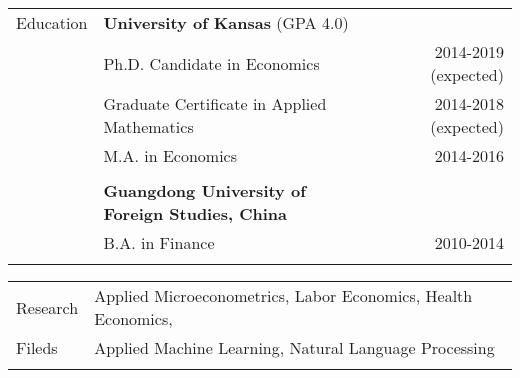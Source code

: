 \documentclass[letterpaper, 11pt]{article}
\begin{document}
\vspace{8mm}


\noindent \begin{tabular}{@{} p{3cm} p{10cm} r}
	\Large{Education}    & \textbf{University of Kansas} (GPA 4.0)\\
	& \hspace{5mm}Ph.D. Candidate in Economics & 2014-2019 (expected) \\
	& \hspace{5mm}Graduate Certificate in Applied Mathematics & 2014-2018 (expected) \\
	& \hspace{5mm}M.A. in Economics & 2014-2016 \\
	& \\
	& \textbf{Guangdong University of Foreign Studies, China} \\
	& \hspace{5mm}B.A. in Finance & 2010-2014 \\
	& \\
\end{tabular}





\noindent \begin{tabular}{@{} p{3cm} l}
	\Large{Research}  & Applied Microeconometrics, Labor Economics, Health Economics, \\
	\Large{Fileds} & Applied Machine Learning, Natural Language Processing \\
	& \\
\end{tabular}
\end{document}
